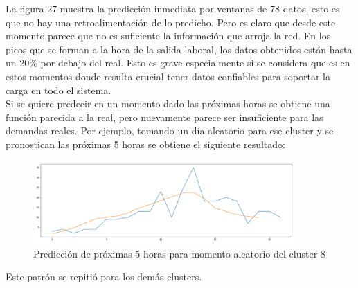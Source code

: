 \documentclass[12pt,spanish]{article}
\begin{document}
	La figura 27 muestra la predicción inmediata por ventanas de 78 datos, esto es que no hay una retroalimentación de lo predicho. Pero es claro que desde este momento parece que no es suficiente la información que arroja la red. En los picos que se forman a la hora de la salida laboral, los datos obtenidos están hasta un 20\% por debajo del real. Esto es grave especialmente si se considera que es en estos momentos donde resulta crucial tener datos confiables para soportar la carga en todo el sistema.\\
	Si se quiere predecir en un momento dado las próximas horas se obtiene una función parecida a la real, pero nuevamente parece ser insuficiente para las demandas reales. Por ejemplo, tomando un día aleatorio para ese cluster y se pronostican las próximas 5 horas se obtiene el siguiente resultado:
	\begin{figure}[H]
		\centering
		\includegraphics[width=10cm]{Imagenes/m8_prediction.PNG}
		\begin{centering}
			\caption{Predicción de próximas 5 horas para momento aleatorio del cluster 8}
		\end{centering}
	\end{figure}
	Este patrón se repitió para los demás clusters.
	\newpage
\end{document}

